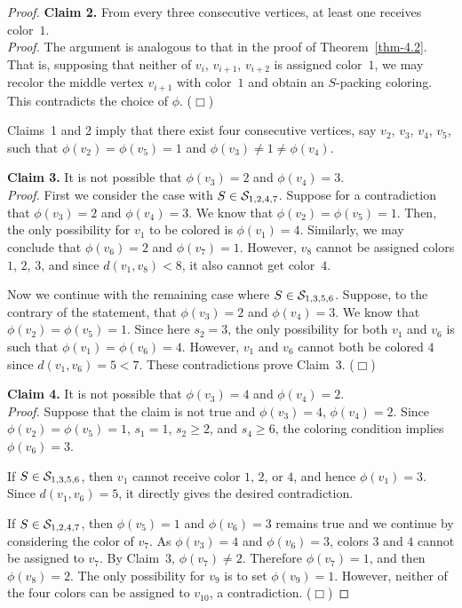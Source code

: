 \documentclass[12pt]{article}
\newcommand{\smallqed}{{\tiny ($\Box$)}}
\newcommand{\cS}{{\cal S}}
\begin{document}
\begin{proof}
  \textbf{Claim 2.} From every three consecutive vertices, at least one receives color~$1$. \\
   \noindent \textit{Proof.}
   The argument is analogous to that in the proof of Theorem~\ref{thm-4.2}.
    That is, supposing that neither of $v_i$, $v_{i+1}$, $v_{i+2}$ is assigned  color~$1$, we may recolor the middle vertex $v_{i+1}$ with color~$1$ and obtain an $S$-packing coloring. This contradicts the choice of $\phi$.  \smallqed
   \medskip
   
Claims~1 and 2 imply that there exist four consecutive vertices, say $v_2$, $v_3$, $v_4$, $v_5$, such that $\phi(v_2)=\phi(v_5)=1$ and $\phi(v_3)\neq 1 \neq \phi(v_4)$.  %
  
\textbf{Claim 3.} 
It is not possible that $\phi(v_3)=2$ and $\phi(v_4)= 3$.\\
 \noindent \textit{Proof.}
First we consider the case with $S \in \cS_{1,2,4,7}$. Suppose for a contradiction that $\phi(v_3)=2$ and $\phi(v_4)= 3$. We know that $\phi(v_2)=\phi(v_5)=1$. Then, the only possibility for $v_1$ to be colored is $\phi(v_1)=4$. Similarly, we may conclude that $\phi(v_6)= 2$ and $\phi(v_7)=1$. However, $v_8$ cannot be assigned colors $1$, $2$, $3$, and since $d(v_1, v_8) <8$, it also cannot get color~$4$. 

Now we continue with the remaining case where $S \in \cS_{1,3,5,6}$. Suppose, to the contrary of the statement, that $\phi(v_3)=2$ and $\phi(v_4)= 3$. We know that $\phi(v_2)=\phi(v_5)=1$. Since here $s_2=3$, the only possibility for both $v_1$ and $v_6$ is such that $\phi(v_1)=\phi(v_6)=4$.  However, $v_1$ and $v_6$ cannot both be colored $4$ since $d(v_1,v_6)=5<7$.  
These contradictions prove Claim~3. \smallqed

\textbf{Claim 4.} It is not possible that $\phi(v_3)=4$ and $\phi(v_4)= 2$.\\
 \noindent \textit{Proof.}
Suppose that the claim is not true and $\phi(v_3)=4$, $\phi(v_4)= 2$. Since $\phi(v_2)=\phi(v_5)=1$, $s_1=1$, $s_2 \ge 2$, and $s_4 \ge 6$, the coloring condition implies $\phi(v_6)=3$.

If $S \in \cS_{1,3,5,6}$, then $v_1$ cannot receive color $1$, $2$, or $4$, and hence $\phi(v_1)=3$. 
Since $d(v_1, v_6)=5$, it directly gives the desired contradiction.

If $S \in \cS_{1,2,4,7}$, then $\phi(v_5)=1$ and $\phi(v_6)=3$ remains true and we continue by considering the color of $v_7$. As $\phi(v_3)=4$ and $\phi(v_6)=3$, colors $3$ and $4$ cannot be assigned to $v_7$. By Claim~3, $\phi(v_7) \neq 2$. 
Therefore $\phi(v_7)=1$, and then $\phi(v_8)=2$. The only possibility for $v_9$ is to set $\phi(v_9)=1$. However, neither of the four colors can be assigned to $v_{10}$, a contradiction. \smallqed


\end{proof}
\end{document}
